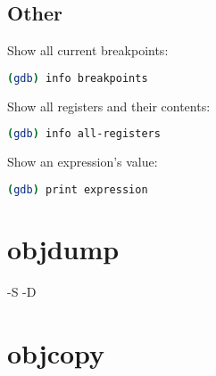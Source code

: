 \documentclass{article}
\begin{document}
	\subsection{Other}
	
	Show all current breakpoints:
	
	\begin{lstlisting}[language=bash]
    (gdb) info breakpoints
    \end{lstlisting}
    
    Show all registers and their contents:
    \begin{lstlisting}[language=bash]
    (gdb) info all-registers
    \end{lstlisting}
    
    Show an expression's value:
    \begin{lstlisting}[language=bash]
    (gdb) print expression
    \end{lstlisting}
    
    \newpage
    \section{objdump}
    
    -S -D
    
    \section{objcopy}
	
\end{document}

